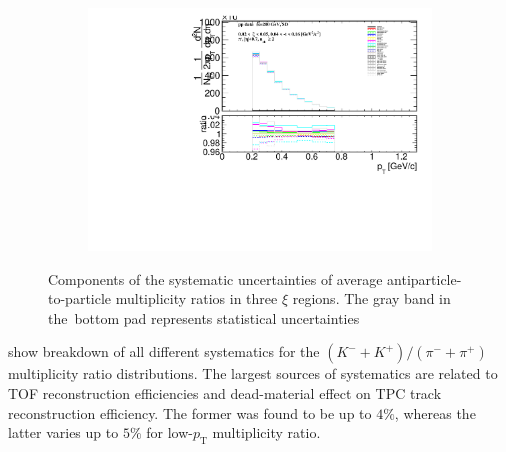 \begin{figure}[h!]
\begin{subfigure}{.49\textwidth}
			\includegraphics[width=\textwidth,page=39]{chapters/chrgSTAR/img/syst/outPID_SDT_ratio.pdf}
		\end{subfigure}
		\begin{minipage}{.49\textwidth}
			\caption{Components of the systematic uncertainties of average antiparticle-to-particle multiplicity ratios  in three $\xi$ regions. The gray band in the~bottom pad represents statistical uncertainties}
			\label{fig:results_star_syst_xi_part}
		\end{minipage}
\end{figure}
\FloatBarrier
\newpage
{} show breakdown of all different systematics for the $\left(K^-+K^+\right)/\left(\pi^-+\pi^+\right)$ multiplicity ratio distributions. The largest sources of systematics are related to TOF reconstruction efficiencies and dead-material effect on TPC track reconstruction efficiency. The former was found to be up to $4\%$, whereas the latter varies up to $5\%$ for low-$p_\textrm{T}$  multiplicity ratio. 
